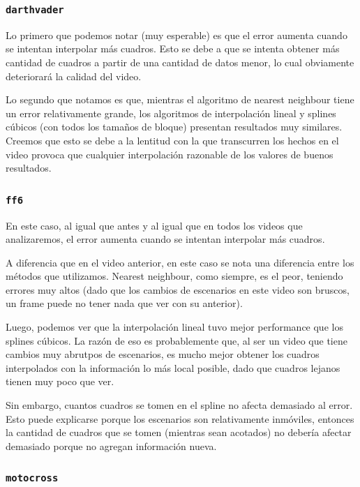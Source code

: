 \subsubsection{\texttt{darthvader}}

Lo primero que podemos notar (muy esperable) es que el error aumenta cuando se intentan interpolar más cuadros. Esto se debe a que se intenta obtener más cantidad de cuadros a partir de una cantidad de datos menor, lo cual obviamente deteriorará la calidad del video.

Lo segundo que notamos es que, mientras el algoritmo de nearest neighbour tiene un error relativamente grande, los algoritmos de interpolación lineal y splines cúbicos (con todos los tamaños de bloque) presentan resultados muy similares. 
Creemos que esto se debe a la lentitud con la que transcurren los hechos en el video provoca que cualquier interpolación razonable de los valores de buenos resultados. 


\subsubsection{\texttt{ff6}}

En este caso, al igual que antes y al igual que en todos los videos que analizaremos, el error aumenta cuando se intentan interpolar más cuadros.


A diferencia que en el video anterior, en este caso se nota una diferencia entre los m\'etodos que utilizamos. Nearest neighbour, como siempre, es el peor, teniendo errores muy altos (dado que los cambios de escenarios en este video son bruscos, un frame puede no tener nada que ver con su anterior).


Luego, podemos ver que la interpolación lineal tuvo mejor performance que los splines cúbicos. La razón de eso es probablemente que, al ser un video que tiene cambios muy abrutpos de escenarios, es mucho mejor obtener los cuadros interpolados con la información lo más local posible, dado que cuadros lejanos tienen muy poco que ver.

Sin embargo, cuantos cuadros se tomen en el spline no afecta demasiado al error. Esto puede explicarse porque los escenarios son relativamente inmóviles, entonces la cantidad de cuadros que se tomen (mientras sean acotados) no debería afectar demasiado porque no agregan información nueva.

\subsubsection{\texttt{motocross}}

